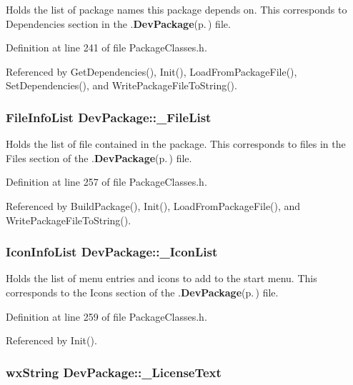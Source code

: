 Holds the list of package names this package depends on. This corresponds to Dependencies section in the .{\bf Dev\-Package}{\rm (p.\,\pageref{class_dev_package})} file. 

Definition at line 241 of file Package\-Classes.h.

Referenced by Get\-Dependencies(), Init(), Load\-From\-Package\-File(), Set\-Dependencies(), and Write\-Package\-File\-To\-String().
\subsubsection{\setlength{\rightskip}{0pt plus 5cm}File\-Info\-List {\bf Dev\-Package::\_\-File\-List}\hspace{0.3cm}{\tt  [private]}}\label{class_dev_package_721705b557cdb9131874599120c31d0d}


Holds the list of file contained in the package. This corresponds to files in the Files section of the .{\bf Dev\-Package}{\rm (p.\,\pageref{class_dev_package})} file. 

Definition at line 257 of file Package\-Classes.h.

Referenced by Build\-Package(), Init(), Load\-From\-Package\-File(), and Write\-Package\-File\-To\-String().
\subsubsection{\setlength{\rightskip}{0pt plus 5cm}Icon\-Info\-List {\bf Dev\-Package::\_\-Icon\-List}\hspace{0.3cm}{\tt  [private]}}\label{class_dev_package_49fe80b01f3b352ef6828dd894fe70fd}


Holds the list of menu entries and icons to add to the start menu. This corresponds to the Icons section of the .{\bf Dev\-Package}{\rm (p.\,\pageref{class_dev_package})} file. 

Definition at line 259 of file Package\-Classes.h.

Referenced by Init().
\subsubsection{\setlength{\rightskip}{0pt plus 5cm}wx\-String {\bf Dev\-Package::\_\-License\-Text}\hspace{0.3cm}{\tt  [private]}}\label{class_dev_package_3b8bf818e5ce6e1b44d35e10ca1a231b}


